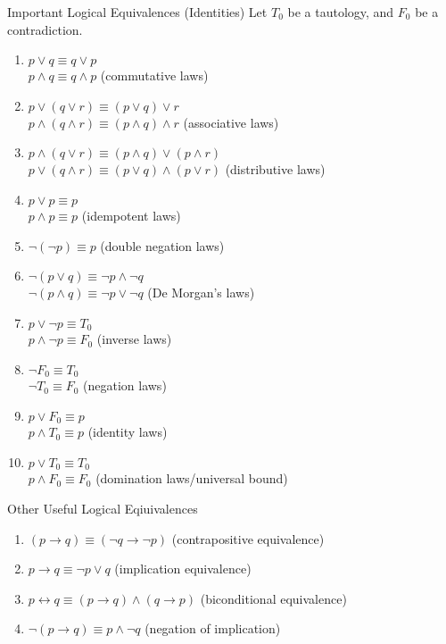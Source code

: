 \documentclass[../notes.tex]{subfiles}
\begin{document}
			\begin{sidenote}{Important Logical Equivalences (Identities)}
				Let $T_{0}$ be a tautology, and $F_{0}$ be a contradiction.
				\begin{enumerate}[label=(\alph*), labelsep=2.5em, leftmargin=*]
					\item $p \lor q \equiv q \lor p$\\
						$p \land q \equiv q \land p$ \hfill (commutative laws)
					\item $p \lor (q \lor r) \equiv (p \lor q) \lor r$\\
						$p \land (q \land r) \equiv (p \land q) \land r$ \hfill (associative laws)
					\item $p \land (q \lor r) \equiv (p \land q) \lor (p \land r)$\\
						$ p \lor (q \land r) \equiv (p \lor q) \land (p \lor r)$ \hfill (distributive laws)
					\item $p \lor p \equiv p$\\
						$ p \land p \equiv p$ \hfill (idempotent laws)
					\item $\lnot (\lnot p) \equiv p$ \hfill (double negation laws)
					\item $\lnot (p \lor q) \equiv \lnot p \land \lnot q$ \\
						$ \lnot (p \land q) \equiv \lnot p \lor \lnot q$ \hfill(De Morgan's laws)
					\item $p \lor \lnot p \equiv T_{0}$\\
						$p \land \lnot p \equiv F_{0} $ \hfill (inverse laws)
					\item $\lnot F_{0} \equiv T_{0}$\\
						$\lnot T_{0} \equiv F_{0} $ \hfill (negation laws)
					\item $p \lor F_{0} \equiv p$\\
						$p \land T_{0} \equiv p$ \hfill (identity laws)
					\item $p \lor T_{0} \equiv T_{0}$\\
						$p \land F_{0} \equiv F_{0}$ \hfill (domination laws/universal bound)
				\end{enumerate}
			\end{sidenote}
			\begin{sidenote}{Other Useful Logical Eqiuivalences}
				\begin{enumerate}[label=(\alph*), labelsep=2.5em, leftmargin=*]
					\item $(p \rightarrow q) \equiv (\lnot q \rightarrow \lnot p)$ \hfill (contrapositive equivalence)
					\item $p \rightarrow q \equiv \lnot p \lor q$ \hfill (implication equivalence)
					\item $p \leftrightarrow q \equiv (p \rightarrow q) \land (q \rightarrow p)$ \hfill (biconditional equivalence)
					\item $\lnot (p \rightarrow q) \equiv p \land \lnot q$ \hfill (negation of implication)
				\end{enumerate}
			\end{sidenote}
\end{document}
